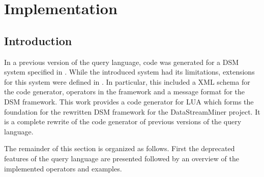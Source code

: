 \section{Implementation}
\subsection{Introduction}
In a previous version of the query language, code was generated for a DSM system
specified in \cite{285:Fischer2010}. While the introduced system had its 
limitations, extensions for this system were defined in \cite{297:Frey2010}. In 
particular, this included a XML schema for the code generator, operators in the 
framework and a message format for the DSM framework. This work provides a code 
generator for LUA which forms the foundation for the rewritten DSM framework for 
the DataStreamMiner project. It is a complete rewrite of the code generator of 
previous versions of the query language.

The remainder of this section is organized as follows. First the deprecated 
features of the query language are presented followed by an overview of the 
implemented operators and examples. 

